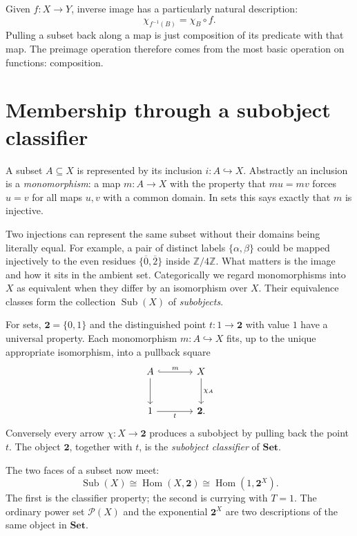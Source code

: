 Given \(f:X\to Y\), inverse image has a particularly natural description:
\[
 \boxed{\chi_{f^{-1}(B)}=\chi_B\circ f.}
\]
Pulling a subset back along a map is just composition of its predicate with that map. The preimage operation therefore comes from the most basic operation on functions: composition.

\section{Membership through a subobject classifier}

A subset $A\subseteq X$ is represented by its inclusion $i:A\hookrightarrow X$. Abstractly an inclusion is a \emph{monomorphism}: a map $m:A\to X$ with the property that $mu=mv$ forces $u=v$ for all maps $u,v$ with a common domain. In sets this says exactly that $m$ is injective.

Two injections can represent the same subset without their domains being literally equal. For example, a pair of distinct labels $\{\alpha,\beta\}$ could be mapped injectively to the even residues $\{\overline0,\overline2\}$ inside $\mathbb Z/4\mathbb Z$. What matters is the image and how it sits in the ambient set. Categorically we regard monomorphisms into $X$ as equivalent when they differ by an isomorphism over $X$. Their equivalence classes form the collection $\operatorname{Sub}(X)$ of \emph{subobjects}.

For sets, $\mathbf2=\{0,1\}$ and the distinguished point $t:1\to\mathbf2$ with value $1$ have a universal property. Each monomorphism $m:A\hookrightarrow X$ fits, up to the unique appropriate isomorphism, into a pullback square
\[
\begin{tikzcd}[row sep=large,column sep=large]
 A\arrow[r,hook,"m"]\arrow[d] &X\arrow[d,"\chi_A"]\\
 1\arrow[r,"t"'] &\mathbf2 .
\end{tikzcd}
\]
Conversely every arrow $\chi:X\to\mathbf2$ produces a subobject by pulling back the point $t$. The object $\mathbf2$, together with $t$, is the \emph{subobject classifier} of $\mathbf{Set}$.

The two faces of a subset now meet:
\[
 \boxed{\operatorname{Sub}(X)
   \cong\operatorname{Hom}(X,\mathbf2)
   \cong\operatorname{Hom}(1,\mathbf2^X).}
\]
The first is the classifier property; the second is currying with $T=1$. The ordinary power set $\mathcal P(X)$ and the exponential $\mathbf2^X$ are two descriptions of the same object in $\mathbf{Set}$.

